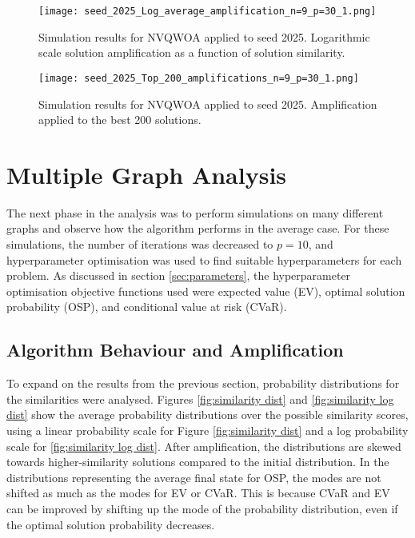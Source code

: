 \begin{figure}[htbp]
    \centering
    \texttt{[image: seed\_2025\_Log\_average\_amplification\_n=9\_p=30\_1.png]}
    \caption{Simulation results for NVQWOA applied to seed 2025. Logarithmic scale solution amplification as a function of solution similarity.}
    \label{fig:2025 av amp}
\end{figure}

\begin{figure}[htbp]
\centering
\texttt{[image: seed\_2025\_Top\_200\_amplifications\_n=9\_p=30\_1.png]}
\caption{Simulation results for NVQWOA applied to seed 2025. Amplification applied to the best 200 solutions.}
\end{figure}



\section{Multiple Graph Analysis}
The next phase in the analysis was to perform simulations on many different graphs and observe how the algorithm performs in the average case. For these simulations, the number of iterations was decreased to $p=10$, and hyperparameter optimisation was used to find suitable hyperparameters for each problem. As discussed in section \ref{sec:parameters}, the hyperparameter optimisation objective functions used were expected value (EV), optimal solution probability (OSP), and conditional value at risk (CVaR).

\subsection{Algorithm Behaviour and Amplification}

To expand on the results from the previous section, probability distributions for the similarities were analysed. Figures \ref{fig:similarity dist} and \ref{fig:similarity log dist} show the average probability distributions over the possible similarity scores, using a linear probability scale for Figure \ref{fig:similarity dist} and a log probability scale for \ref{fig:similarity log dist}. After amplification, the distributions are skewed towards higher-similarity solutions compared to the initial distribution. In the distributions representing the average final state for OSP, the modes are not shifted as much as the modes for EV or CVaR. This is because CVaR and EV can be improved by shifting up the mode of the probability distribution, even if the optimal solution probability decreases.

